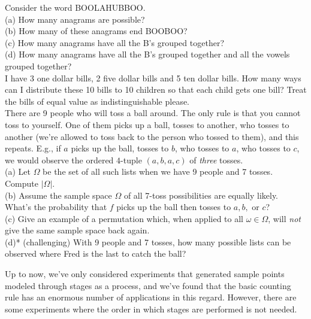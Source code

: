 \documentclass[12pt]{article}
\begin{document}
 Consider the word BOOLAHUBBOO.\\
(a) How many anagrams are possible?\\
(b) How many of these anagrams end BOOBOO?\\
(c) How many anagrams have all the B's grouped together?\\
(d) How many anagrams have all the B's grouped together and all the vowels grouped together?\\

 I have 3 one dollar bills, 2 five dollar bills and 5 ten dollar bills.  How many ways can I
distribute these 10 bills to 10 children so that each child gets one bill?
Treat the bills of equal value as indistinguishable please.\\


There are 9 people who will toss a ball around. The only rule is that you cannot toss to yourself.
 One of them picks up a ball, tosses to another,
who tosses to another (we're allowed to toss back to the person who tossed to them), and this repeats. E.g., if $a$ picks up the ball, tosses to $b$,
who tosses to $a$, who tosses to $c$, we would observe the ordered $4$-tuple $(a,b,a,c)$ of {\em three} tosses.\\
(a) Let $\Omega$ be the set of all such lists when we have 9 people and 7 tosses. Compute $|\Omega|$.\\
(b) Assume the sample space $\Omega$ of all 7-toss possibilities are equally likely.  What's the probability that $f$ picks up the ball then tosses to $a,b,$ or $c$?\\
(c) Give an example of a permutation which, when applied to all $\omega\in \Omega$, will {\em not} give the same sample space back again.\\
(d)* (challenging) With 9 people and 7 tosses, how many possible lists can be observed where Fred is the last to catch the ball?\\





\newpage




\noindent Up to now, we've only considered experiments that generated
sample points modeled through stages as a process, and we've found that the basic counting rule
has an enormous number of applications in this regard.  However, there are some experiments
where the order in which stages are performed is not needed.\\
\end{document}
